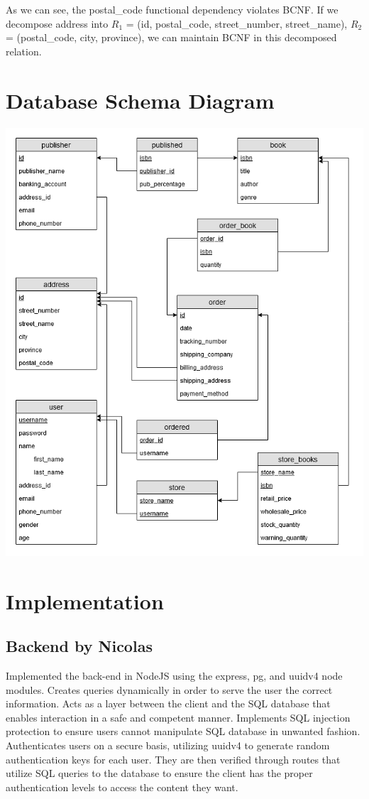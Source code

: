 \documentclass{article}
\begin{document}
    \noindent As we can see, the postal\_code functional dependency violates BCNF. If we decompose address into $R_1$ = (id, postal\_code, street\_number, street\_name), $R_2$ = (postal\_code, city, province), we can maintain BCNF in this decomposed relation.
    
    \section{Database Schema Diagram}
    
    \includegraphics[width=16cm]{schema-diagram_current.png}

    \section{Implementation}

    \subsection{Backend by Nicolas}
    
    Implemented the back-end in NodeJS using the express, pg, and uuidv4 node modules. Creates queries dynamically in order to serve the user the correct information. Acts as a layer between the client and the SQL database that enables interaction in a safe and competent manner. Implements SQL injection protection to ensure users cannot manipulate SQL database in unwanted fashion. Authenticates users on a secure basis, utilizing uuidv4 to generate random authentication keys for each user. They are then verified through routes that utilize SQL queries to the database to ensure the client has the proper authentication levels to access the content they want.
    
\end{document}
